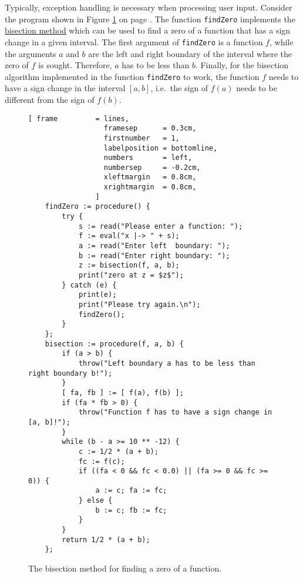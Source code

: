 Typically, exception handling is necessary when  processing user input.  Consider the program
shown in Figure \ref{fig:bisection-exception.stlx} on page \pageref{fig:bisection-exception.stlx}.
The function \texttt{findZero} implements 
the \href{https://en.wikipedia.org/wiki/Bisection_method}{bisection method} which can be used to
find a zero of a function that has a sign change in a given interval.  The first argument of 
\texttt{findZero} is a function $f$, while the arguments $a$ and $b$ are the left and right
boundary of the interval where the zero of $f$ is sought.  Therefore, $a$ has to be less than
$b$.  Finally, for the bisection algorithm implemented in the function \texttt{findZero} to
work, the function $f$ needs to have a sign change in the interval $[a,b]$, i.e.~the sign of $f(a)$
needs to be different from the sign of $f(b)$.  

\begin{figure}[!ht]
\centering
\begin{Verbatim}[ frame         = lines, 
                  framesep      = 0.3cm, 
                  firstnumber   = 1,
                  labelposition = bottomline,
                  numbers       = left,
                  numbersep     = -0.2cm,
                  xleftmargin   = 0.8cm,
                  xrightmargin  = 0.8cm,
                ]
    findZero := procedure() {
        try {
            s := read("Please enter a function: ");
            f := eval("x |-> " + s);
            a := read("Enter left  boundary: ");
            b := read("Enter right boundary: ");
            z := bisection(f, a, b);
            print("zero at z = $z$");
        } catch (e) {
            print(e);
            print("Please try again.\n");
            findZero();
        }
    };
    bisection := procedure(f, a, b) {
        if (a > b) {
            throw("Left boundary a has to be less than right boundary b!");   
        }
        [ fa, fb ] := [ f(a), f(b) ]; 
        if (fa * fb > 0) {
            throw("Function f has to have a sign change in [a, b]!");
        }
        while (b - a >= 10 ** -12) {
            c := 1/2 * (a + b);
            fc := f(c); 
            if ((fa < 0 && fc < 0.0) || (fa >= 0 && fc >= 0)) {
                a := c; fa := fc; 
            } else {
                b := c; fb := fc; 
            }
        }
        return 1/2 * (a + b);
    };
\end{Verbatim}
\vspace*{-0.3cm}
\caption{The bisection method for finding a zero of a function.}
\label{fig:bisection-exception.stlx}
\end{figure}

